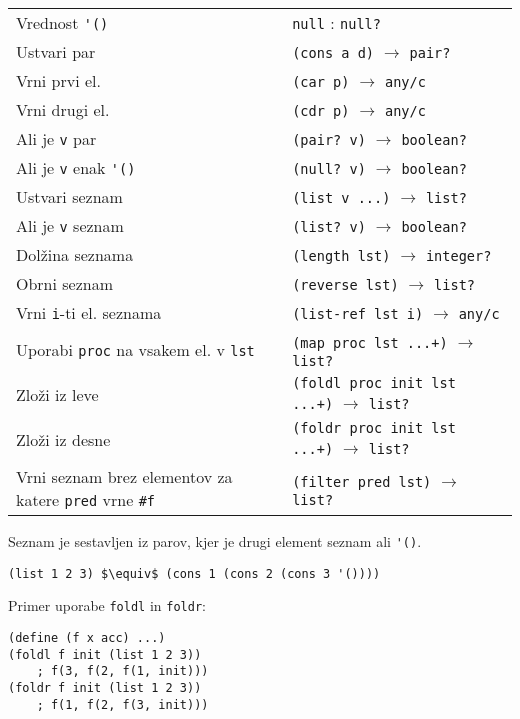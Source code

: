 \documentclass[a3paper,9pt]{extarticle}
\begin{document}
\begin{multicols}{4}
\begin{tabular}{@{}p{3.2cm}l@{}}
    Vrednost \lstinline|'()| & \lstinline|null| : \lstinline|null?|\\
    Ustvari par & \lstinline|(cons a d)| $\rightarrow$ \lstinline|pair?|\\
    Vrni prvi el. & \lstinline|(car p)| $\rightarrow$ \lstinline|any/c|\\
    Vrni drugi el. & \lstinline|(cdr p)| $\rightarrow$ \lstinline|any/c|\\
    Ali je \lstinline|v| par & \lstinline|(pair? v)| $\rightarrow$ \lstinline|boolean?|\\
    Ali je \lstinline|v| enak \lstinline|'()| & \lstinline|(null? v)| $\rightarrow$ \lstinline|boolean?|\\
    Ustvari seznam & \lstinline|(list v ...)| $\rightarrow$ \lstinline|list?|\\
    Ali je \lstinline|v| seznam & \lstinline|(list? v)| $\rightarrow$ \lstinline|boolean?|\\
    Dolžina seznama & \lstinline|(length lst)| $\rightarrow$ \lstinline|integer?|\\
    Obrni seznam & \lstinline|(reverse lst)| $\rightarrow$ \lstinline|list?|\\
    Vrni \lstinline|i|-ti el. seznama & \lstinline|(list-ref lst i)| $\rightarrow$ \lstinline|any/c|\\
    Uporabi \lstinline|proc| na vsakem el. v \lstinline|lst| & \lstinline|(map proc lst ...+)| $\rightarrow$ \lstinline|list?|\\
    Zloži iz leve & \lstinline|(foldl proc init lst ...+)| $\rightarrow$ \lstinline|list?|\\
    Zloži iz desne & \lstinline|(foldr proc init lst ...+)| $\rightarrow$ \lstinline|list?|\\
    Vrni seznam brez elementov za katere \lstinline|pred| vrne \lstinline|#f| & \lstinline|(filter pred lst)| $\rightarrow$ \lstinline|list?|\\
\end{tabular}

Seznam je sestavljen iz parov, kjer je drugi element seznam ali \lstinline|'()|.
\begin{lstlisting}
(list 1 2 3) $\equiv$ (cons 1 (cons 2 (cons 3 '())))
\end{lstlisting}

Primer uporabe \lstinline|foldl| in \lstinline|foldr|:
\begin{lstlisting}
(define (f x acc) ...)
(foldl f init (list 1 2 3)) 
    ; f(3, f(2, f(1, init)))
(foldr f init (list 1 2 3)) 
    ; f(1, f(2, f(3, init)))
\end{lstlisting}


\end{multicols}
\end{document}
